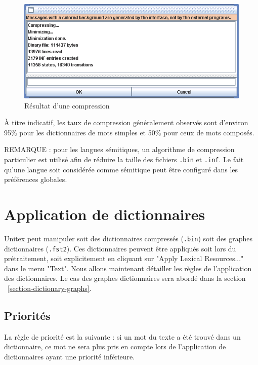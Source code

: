 \bigskip
\begin{figure}[!h]
\begin{center}
\includegraphics[width=14cm]{resources/img/fig3-11.png}
\caption{Résultat d’une compression\label{fig-compression-result}}
\end{center}
\end{figure}

\bigskip
\noindent À titre indicatif, les taux de compression généralement observés sont d’environ 95\% pour
les dictionnaires de mots simples et 50\% pour ceux de mots composés.


\bigskip
\noindent REMARQUE : pour les langues sémitiques, un algorithme de compression particulier est utilisé
afin de réduire la taille des fichiers \verb+.bin+ et \verb+.inf+. Le fait qu'une langue soit
considérée comme sémitique peut être configuré dans les préférences globales.


\section{Application de dictionnaires}
\label{section-applying-dictionaries}

\bigskip
\noindent Unitex peut manipuler soit des dictionnaires compressés (\verb+.bin+) soit des graphes
dictionnaires (\verb+.fst2+). Ces dictionnaires peuvent être appliqués soit lors du prétraitement,
soit explicitement en cliquant sur "Apply Lexical Resources..." dans le menu "Text". Nous allons
maintenant détailler les règles de l’application des dictionnaires. Le cas des graphes dictionnaires
sera abordé dans la section ~\ref{section-dictionary-graphs}.

\subsection{Priorités}
\label{section-dictionary-priorities}
La règle de priorité est la suivante : si un mot du texte a été trouvé dans un dictionnaire,
ce mot ne sera plus pris en compte lors de l’application de dictionnaires ayant une priorité
inférieure.


